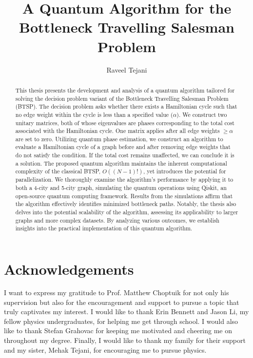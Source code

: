 \documentclass[msc,oneside]{ubcthesis}
\title{A Quantum Algorithm for the Bottleneck Travelling Salesman Problem}
\author{Raveel Tejani}
\begin{document}
	
	
	\frontmatter

	\maketitle               
	

	\clearpage
	\begin{abstract}
		
		This thesis presents the development and analysis of a quantum algorithm tailored for solving the decision problem variant of the Bottleneck Travelling Salesman Problem (BTSP). The decision problem asks whether there exists a Hamiltonian cycle such that no edge weight within the cycle is less than a specified value ($\alpha$). We construct two unitary matrices, both of whose eigenvalues are phases corresponding to the total cost associated with the Hamiltonian cycle. One matrix applies after all edge weights $\geq \alpha$ are set to zero. Utilizing quantum phase estimation, we construct an algorithm to evaluate a Hamiltonian cycle of a graph before and after removing edge weights that do not satisfy the condition. If the total cost remains unaffected, we can conclude it is a solution. The proposed quantum algorithm maintains the inherent computational complexity of the classical BTSP, $O((N-1)!)$, yet introduces the potential for parallelization. We thoroughly examine the algorithm's performance by applying it to both a 4-city and 5-city graph, simulating the quantum operations using Qiskit, an open-source quantum computing framework. Results from the simulations affirm that the algorithm effectively identifies minimized bottleneck paths. Notably, the thesis also delves into the potential scalability of the algorithm, assessing its applicability to larger graphs and more complex datasets. By analyzing various outcomes, we establish insights into the practical implementation of this quantum algorithm.
		
		
	\end{abstract}
	
	
	\tableofcontents 
	\listoftables             
	\listoffigures           

	
	\chapter{Acknowledgements} 
	
	
I want to express my gratitude to Prof. Matthew Choptuik for not only his supervision but also for the encouragement and support to pursue a topic that truly captivates my interest. I would like to thank Erin Bennett and Jason Li, my fellow physics undergraduates, for helping me get through school. I would also like to thank Stefan Grahovac for keeping me motivated and cheering me on throughout my degree. Finally, I would like to thank my family for their support and my sister, Mehak Tejani, for encouraging me to pursue physics.
	
\end{document}
